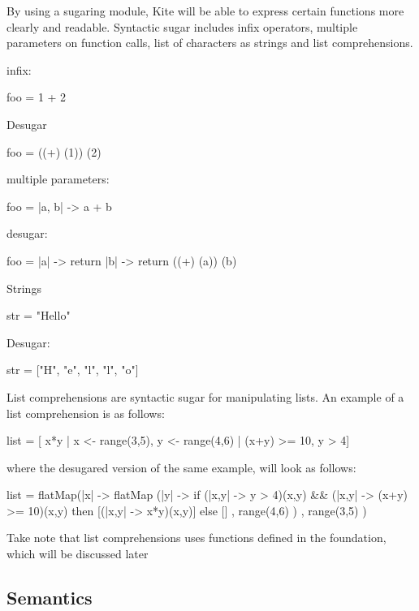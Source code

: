 By using a sugaring module, Kite will be able to express certain
functions more clearly and readable. Syntactic sugar includes infix
operators, multiple parameters on function calls, list of characters
as strings and list comprehensions.

infix:
\begin{kite}
  
  foo = 1 + 2
\end{kite}

Desugar

\begin{kite}

  foo = ((+) (1)) (2)
\end{kite}

multiple parameters:
\begin{kite}
  
  foo = |a, b| -> {
    a + b
  }
\end{kite}
desugar:

\begin{kite}

  foo = |a| -> {
    return |b| -> {
      return ((+) (a)) (b)
    }
  }
\end{kite}
Strings 
\begin{kite}
  
  str = "Hello"
\end{kite}
Desugar:
\begin{kite}
  
  str = ["H", "e", "l", "l", "o"]
\end{kite}

\label{sec:ex-listcomp}
List comprehensions are syntactic sugar for manipulating
lists. An example of a list comprehension is as follows:
\begin{kite}
  
  list = [ x*y | x <- range(3,5), y <- range(4,6) | (x+y) >= 10, y > 4]
\end{kite}
where the desugared version of the same example, will look as follows:
\begin{kite}

  list =
  flatMap(|x| -> {
    flatMap (|y| -> {
      if (|x,y| -> {y > 4})(x,y) && (|x,y| -> {(x+y) >= 10})(x,y) 
         then [(|x,y| -> {x*y})(x,y)] 
         else []
    } , range(4,6) )
}, range(3,5) )
\end{kite}
Take note that list comprehensions uses functions defined in the
foundation, which will be discussed later
\subsection{Semantics}

